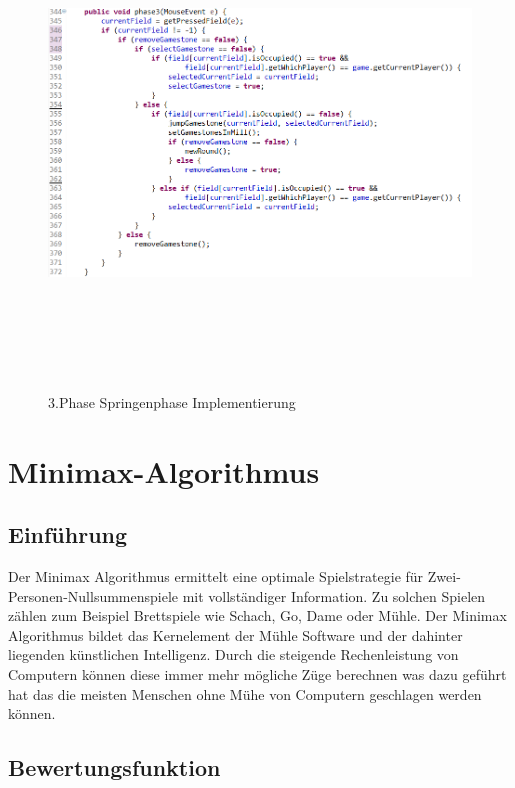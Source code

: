 \documentclass[oneside]{ausarbeitung}
\begin{document}
\begin{figure}[ht]
	\centering
	\includegraphics[width=15cm,height=13cm]{images/springenphaseImplementierung.png}
	\caption[3. Phase Springenphase Implementierung]{3.Phase Springenphase Implementierung}
\end{figure}

\clearpage

\section{Minimax-Algorithmus}

\subsection{Einführung}

Der Minimax Algorithmus ermittelt eine optimale Spielstrategie für Zwei-Personen-Nullsummenspiele mit vollständiger Information. Zu solchen Spielen zählen zum Beispiel Brettspiele wie Schach, Go, Dame oder Mühle. Der Minimax Algorithmus bildet das Kernelement der Mühle Software und der dahinter liegenden künstlichen Intelligenz. Durch die steigende Rechenleistung von Computern können diese immer mehr mögliche Züge berechnen was dazu geführt hat das die meisten Menschen ohne Mühe von Computern geschlagen werden können.

\subsection{Bewertungsfunktion}
\end{document}
